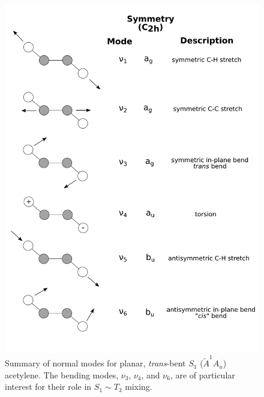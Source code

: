 \begin{figure}
  \centering
  \includegraphics[width=5.8in]{s1-modes.pdf}
  \caption{Summary of normal modes for planar, \emph{trans}-bent $S_1$
    ($\tilde{A}^1A_u$) acetylene.  The bending modes, $\nu_3$,
    $\nu_4$, and $\nu_6$, are of particular interest for their role in
    $S_1 \sim T_3$ mixing.}
  \label{fig:modes}
\end{figure} 



